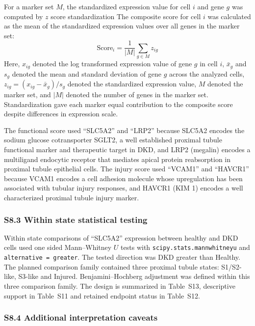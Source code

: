 \documentclass[11pt]{article}
\begin{document}
For a marker set \(M\), the standardized expression value for cell \(i\) and gene \(g\) was computed by \(z\) score standardization  The composite score for cell \(i\) was calculated as the mean of the standardized expression values over all genes in the marker set:
\begin{equation}
\mathrm{Score}_i = \frac{1}{|M|}\sum_{g \in M} z_{ig}
\label{eq:supp_composite_score}
\end{equation}
Here, \(x_{ig}\) denoted the log transformed expression value of gene \(g\) in cell \(i\), \(\bar{x}_g\) and \(s_g\) denoted the mean and standard deviation of gene \(g\) across the analyzed cells, \(z_{ig} = (x_{ig} - \bar{x}_g)/s_g\) denoted the standardized expression value, \(M\) denoted the marker set, and \(|M|\) denoted the number of genes in the marker set. Standardization gave each marker equal contribution to the composite score despite differences in expression scale.

The functional score used ``SLC5A2'' and ``LRP2'' because SLC5A2 encodes the sodium glucose cotransporter SGLT2, a well established proximal tubule functional marker and therapeutic target in DKD, and LRP2 (megalin) encodes a multiligand endocytic receptor that mediates apical protein reabsorption in proximal tubule epithelial cells. The injury score used ``VCAM1'' and ``HAVCR1'' because VCAM1 encodes a cell adhesion molecule whose upregulation has been associated with tubular injury responses, and HAVCR1 (KIM 1) encodes a well characterized proximal tubule injury marker.
\subsubsection*{S8.3 Within state statistical testing}

Within state comparisons of ``SLC5A2'' expression between healthy and DKD cells used one sided Mann--Whitney \(U\) tests with \texttt{scipy.stats.mannwhitneyu} and \texttt{alternative = greater}. The tested direction was DKD greater than Healthy. The planned comparison family contained three proximal tubule states: S1/S2-like, S3-like and Injured. Benjamini--Hochberg adjustment was defined within this three comparison family. The design is summarized in Table~S13, descriptive support in Table~S11 and retained endpoint status in Table~S12.

\subsubsection*{S8.4 Additional interpretation caveats}
\end{document}

